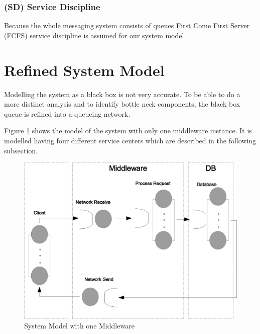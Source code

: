 \documentclass[a4paper]{article}
\begin{document}
\subsubsection{(SD) Service Discipline}
Because the whole messaging system consists of queues  First Come First Server (FCFS) service discipline is assumed for our system model.

\section{Refined System Model}
\label{sec:RefinedSystemModel}

Modelling the system as a black box is not very accurate. To be able to do a more distinct analysis and to identify bottle neck components, the black box queue is refined into a queueing network.

Figure \ref{fig:systemmodel-singlebroker} shows the model of the system with only one middleware instance. It is modelled having four different service centers which are described in the following subsection.


\begin{figure}[H]
	\begin{center}
    \includegraphics[scale=0.6]{../drawings-ms2/systemmodel-singlebroker.eps}
  \end{center}
  \caption{System Model with one Middleware}
  \label{fig:systemmodel-singlebroker}
\end{figure}

\end{document}
